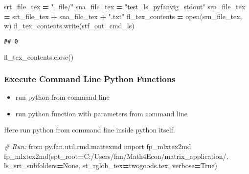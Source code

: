 \documentclass[
]{book}
\newenvironment{Shaded}{\begin{snugshade}}{\end{snugshade}}
\newcommand{\BuiltInTok}[1]{#1}
\newcommand{\CommentTok}[1]{\textcolor[rgb]{0.56,0.35,0.01}{\textit{#1}}}
\newcommand{\ImportTok}[1]{#1}
\newcommand{\NormalTok}[1]{#1}
\newcommand{\OperatorTok}[1]{\textcolor[rgb]{0.81,0.36,0.00}{\textbf{#1}}}
\newcommand{\StringTok}[1]{\textcolor[rgb]{0.31,0.60,0.02}{#1}}
\newcommand{\VariableTok}[1]{\textcolor[rgb]{0.00,0.00,0.00}{#1}}
\providecommand{\tightlist}{%
  \setlength{\itemsep}{0pt}\setlength{\parskip}{0pt}}
\begin{document}
\begin{Shaded}
\begin{Highlighting}[]
\NormalTok{srt\_file\_tex }\OperatorTok{=} \StringTok{"\_file/"}
\NormalTok{sna\_file\_tex }\OperatorTok{=} \StringTok{"test\_ls\_pyfanvig\_stdout"}
\NormalTok{srn\_file\_tex }\OperatorTok{=}\NormalTok{ srt\_file\_tex }\OperatorTok{+}\NormalTok{ sna\_file\_tex }\OperatorTok{+} \StringTok{".txt"}
\NormalTok{fl\_tex\_contents }\OperatorTok{=} \BuiltInTok{open}\NormalTok{(srn\_file\_tex, }\StringTok{\textquotesingle{}w\textquotesingle{}}\NormalTok{)}
\NormalTok{fl\_tex\_contents.write(stf\_out\_cmd\_ls)}
\end{Highlighting}
\end{Shaded}

\begin{verbatim}
## 0
\end{verbatim}

\begin{Shaded}
\begin{Highlighting}[]
\NormalTok{fl\_tex\_contents.close()}
\end{Highlighting}
\end{Shaded}

\hypertarget{execute-command-line-python-functions}{%
\subsubsection{Execute Command Line Python Functions}\label{execute-command-line-python-functions}}

\begin{itemize}
\tightlist
\item
  run python from command line
\item
  run python function with parameters from command line
\end{itemize}

Here run python from command line inside python itself.

\begin{Shaded}
\begin{Highlighting}[]
\CommentTok{\# Run:}
\ImportTok{from}\NormalTok{ py.fan.util.rmd.mattexmd }\ImportTok{import}\NormalTok{ fp\_mlxtex2md}
\NormalTok{fp\_mlxtex2md(spt\_root}\OperatorTok{=}\StringTok{\textquotesingle{}C:/Users/fan/Math4Econ/matrix\_application/\textquotesingle{}}\NormalTok{, ls\_srt\_subfolders}\OperatorTok{=}\VariableTok{None}\NormalTok{, st\_rglob\_tex}\OperatorTok{=}\StringTok{\textquotesingle{}twogoods.tex\textquotesingle{}}\NormalTok{, verbose}\OperatorTok{=}\VariableTok{True}\NormalTok{)}
\end{Highlighting}
\end{Shaded}
\end{document}
